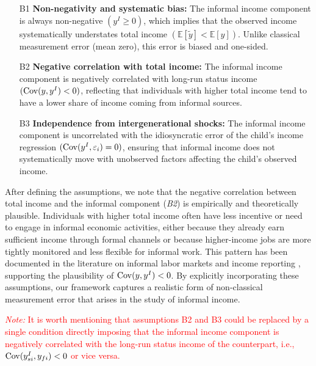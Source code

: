 \begin{assumption}\leavevmode
\begin{itemize}[nosep]
   \item[B1] \textbf{Non-negativity and systematic bias:} The informal income component is always non-negative $(y^I \ge 0)$, which implies that the observed income systematically understates total income $(\mathbb{E}[\tilde y] < \mathbb{E}[y])$. Unlike classical measurement error (mean zero), this error is biased and one-sided.
   
   \item[B2] \textbf{Negative correlation with total income:} The informal income component is negatively correlated with long-run status income $(\operatorname{Cov}(y, y^I) < 0)$, reflecting that individuals with higher total income tend to have a lower share of income coming from informal sources.
   
   \item[B3] \textbf{Independence from intergenerational shocks:} The informal income component is uncorrelated with the idiosyncratic error of the child’s income regression $(\operatorname{Cov}(y^I, \varepsilon_i) = 0)$, ensuring that informal income does not systematically move with unobserved factors affecting the child’s observed income.
\end{itemize}

\end{assumption}

After defining the assumptions, we note that the negative correlation between total income and the informal component (\emph{B2}) is empirically and theoretically plausible. Individuals with higher total income often have less incentive or need to engage in informal economic activities, either because they already earn sufficient income through formal channels or because higher-income jobs are more tightly monitored and less flexible for informal work. This pattern has been documented in the literature on informal labor markets and income reporting \parencite[see, e.g.,][]{Montenegro_2010,Gomes_2020}, supporting the plausibility of $\operatorname{Cov}(y, y^I) < 0$. By explicitly incorporating these assumptions, our framework captures a realistic form of non-classical measurement error that arises in the study of informal income.

\textcolor{red}{\textit{Note:}  It is worth mentioning that assumptions B2 and B3 could be replaced by a single condition directly imposing that the informal income component is negatively correlated with the long-run status income of the counterpart, i.e., $\operatorname{Cov}(y^I_{si}, y_{fi}) < 0$ or vice versa.}


